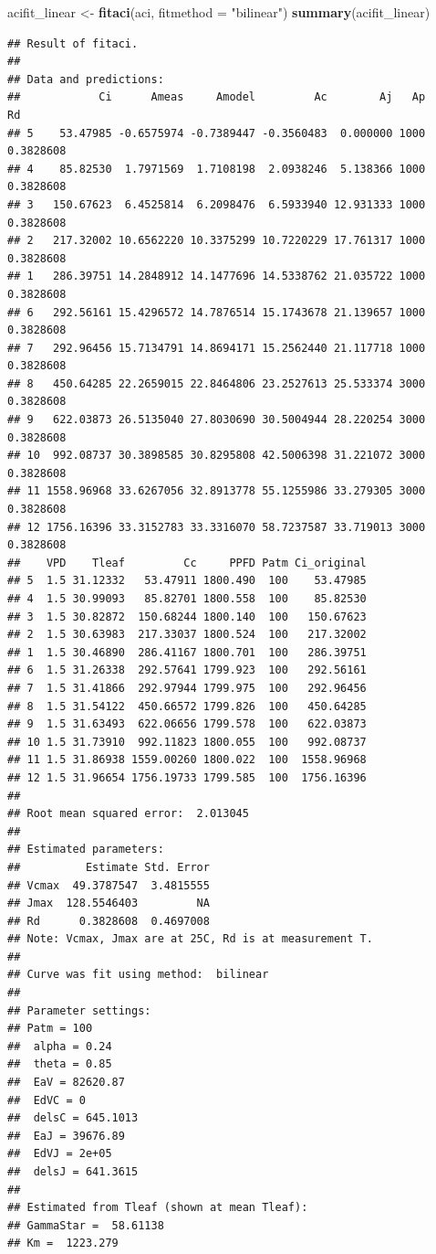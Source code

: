\documentclass[]{krantz}
\makeatletter
\newenvironment{Shaded}{\begin{snugshade}}{\end{snugshade}}
\newcommand{\KeywordTok}[1]{\textcolor[rgb]{0.13,0.29,0.53}{\textbf{#1}}}
\newcommand{\DataTypeTok}[1]{\textcolor[rgb]{0.13,0.29,0.53}{#1}}
\newcommand{\StringTok}[1]{\textcolor[rgb]{0.31,0.60,0.02}{#1}}
\newcommand{\NormalTok}[1]{#1}
\newenvironment{kframe}{%
\medskip{}
\setlength{\fboxsep}{.8em}
 \def\at@end@of@kframe{}%
 \ifinner\ifhmode%
  \def\at@end@of@kframe{\end{minipage}}%
  \begin{minipage}{\columnwidth}%
 \fi\fi%
 \def\FrameCommand##1{\hskip\@totalleftmargin \hskip-\fboxsep
 \colorbox{shadecolor}{##1}\hskip-\fboxsep
     \hskip-\linewidth \hskip-\@totalleftmargin \hskip\columnwidth}%
 \MakeFramed {\advance\hsize-\width
   \@totalleftmargin\z@ \linewidth\hsize
   \@setminipage}}%
 {\par\unskip\endMakeFramed%
 \at@end@of@kframe}
\renewenvironment{Shaded}{\begin{kframe}}{\end{kframe}}
\theoremstyle{definition}
\theoremstyle{definition}
\theoremstyle{definition}
\theoremstyle{remark}
\makeatother
\begin{document}
\begin{Shaded}
\begin{Highlighting}[]
\NormalTok{acifit_linear <-}\StringTok{ }\KeywordTok{fitaci}\NormalTok{(aci,  }\DataTypeTok{fitmethod =} \StringTok{"bilinear"}\NormalTok{)}
\KeywordTok{summary}\NormalTok{(acifit_linear)}
\end{Highlighting}
\end{Shaded}

\begin{verbatim}
## Result of fitaci.
## 
## Data and predictions:
##            Ci      Ameas     Amodel         Ac        Aj   Ap        Rd
## 5    53.47985 -0.6575974 -0.7389447 -0.3560483  0.000000 1000 0.3828608
## 4    85.82530  1.7971569  1.7108198  2.0938246  5.138366 1000 0.3828608
## 3   150.67623  6.4525814  6.2098476  6.5933940 12.931333 1000 0.3828608
## 2   217.32002 10.6562220 10.3375299 10.7220229 17.761317 1000 0.3828608
## 1   286.39751 14.2848912 14.1477696 14.5338762 21.035722 1000 0.3828608
## 6   292.56161 15.4296572 14.7876514 15.1743678 21.139657 1000 0.3828608
## 7   292.96456 15.7134791 14.8694171 15.2562440 21.117718 1000 0.3828608
## 8   450.64285 22.2659015 22.8464806 23.2527613 25.533374 3000 0.3828608
## 9   622.03873 26.5135040 27.8030690 30.5004944 28.220254 3000 0.3828608
## 10  992.08737 30.3898585 30.8295808 42.5006398 31.221072 3000 0.3828608
## 11 1558.96968 33.6267056 32.8913778 55.1255986 33.279305 3000 0.3828608
## 12 1756.16396 33.3152783 33.3316070 58.7237587 33.719013 3000 0.3828608
##    VPD    Tleaf         Cc     PPFD Patm Ci_original
## 5  1.5 31.12332   53.47911 1800.490  100    53.47985
## 4  1.5 30.99093   85.82701 1800.558  100    85.82530
## 3  1.5 30.82872  150.68244 1800.140  100   150.67623
## 2  1.5 30.63983  217.33037 1800.524  100   217.32002
## 1  1.5 30.46890  286.41167 1800.701  100   286.39751
## 6  1.5 31.26338  292.57641 1799.923  100   292.56161
## 7  1.5 31.41866  292.97944 1799.975  100   292.96456
## 8  1.5 31.54122  450.66572 1799.826  100   450.64285
## 9  1.5 31.63493  622.06656 1799.578  100   622.03873
## 10 1.5 31.73910  992.11823 1800.055  100   992.08737
## 11 1.5 31.86938 1559.00260 1800.022  100  1558.96968
## 12 1.5 31.96654 1756.19733 1799.585  100  1756.16396
## 
## Root mean squared error:  2.013045 
## 
## Estimated parameters:
##          Estimate Std. Error
## Vcmax  49.3787547  3.4815555
## Jmax  128.5546403         NA
## Rd      0.3828608  0.4697008
## Note: Vcmax, Jmax are at 25C, Rd is at measurement T.
## 
## Curve was fit using method:  bilinear 
## 
## Parameter settings:
## Patm = 100
##  alpha = 0.24
##  theta = 0.85
##  EaV = 82620.87
##  EdVC = 0
##  delsC = 645.1013
##  EaJ = 39676.89
##  EdVJ = 2e+05
##  delsJ = 641.3615
## 
## Estimated from Tleaf (shown at mean Tleaf):
## GammaStar =  58.61138 
## Km =  1223.279
\end{verbatim}
\end{document}
